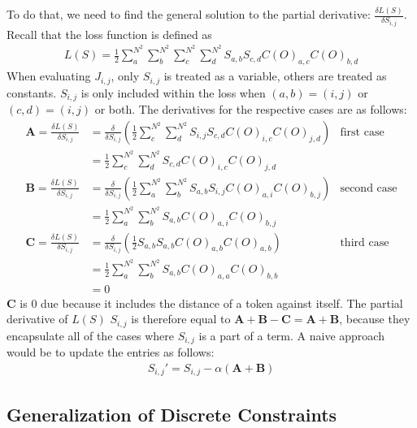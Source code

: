 To do that, we need to find the general solution to the partial derivative: $ \frac{\delta L(S)}{\delta S_{i,j}}$. Recall that the loss function is defined as
\begin{align*}
    L(S)=\frac{1}{2}\sum_{a}^{N^2} \sum_{b}^{N^2} \sum_{c}^{N^2} \sum_{d}^{N^2} S_{a,b} S_{c,d} C(O)_{a,c}C(O)_{b,d}
\end{align*}
When evaluating $J_{i,j}$, only $S_{i,j}$ is treated as a variable, others are treated as constants. $S_{i,j}$ is only included within the loss when $(a,b)=(i,j)$ or $(c,d)=(i,j)$ or both. The derivatives for the respective cases are as follows:
\begin{align*}
        \bm{A}=\frac{\delta L(S)}{\delta S_{i,j}}&=\frac{\delta}{\delta S_{i,j}}\left(\frac{1}{2}\sum_{c}^{N^2} \sum_{d}^{N^2} S_{i,j} S_{c,d} C(O)_{i,c}C(O)_{j,d}\right)&\text{first case}\\
              &=\frac{1}{2}\sum_{c}^{N^2} \sum_{d}^{N^2} S_{c,d} C(O)_{i,c}C(O)_{j,d}&\\
        \bm{B}=\frac{\delta L(S)}{\delta S_{i,j}}&=\frac{\delta}{\delta S_{i,j}}\left(\frac{1}{2}\sum_{a}^{N^2} \sum_{b}^{N^2} S_{a,b} S_{i,j} C(O)_{a,i}C(O)_{b,j}\right)&\text{second case}\\
              &=\frac{1}{2}\sum_{a}^{N^2} \sum_{b}^{N^2} S_{a,b} C(O)_{a,i}C(O)_{b,j}&\\
        \bm{C}=\frac{\delta L(S)}{\delta S_{i,j}}&=\frac{\delta}{\delta S_{i,j}}\left(\frac{1}{2}S_{a,b} S_{a,b} C(O)_{a,b}C(O)_{a,b}\right)&\text{third case}\\
              &=\frac{1}{2}\sum_{a}^{N^2} \sum_{b}^{N^2} S_{a,b} C(O)_{a,a}C(O)_{b,b}&\\
              &=0&
\end{align*}
$\bm{C}$ is $0$ due because it includes the distance of a token against itself. The partial derivative of $L(S)$ \wrt{} $S_{i,j}$ is therefore equal to $\bm{A}+\bm{B}-\bm{C}=\bm{A}+\bm{B}$, because they encapsulate all of the cases where $S_{i,j}$ is a part of a term. A naive approach would be to update the entries as follows:
\begin{align*}
        S_{i,j}'=S_{i,j}-\alpha \left(\bm{A}+\bm{B}\right)
\end{align*}

\subsection{Generalization of Discrete Constraints}%
\label{sub:constraints}

